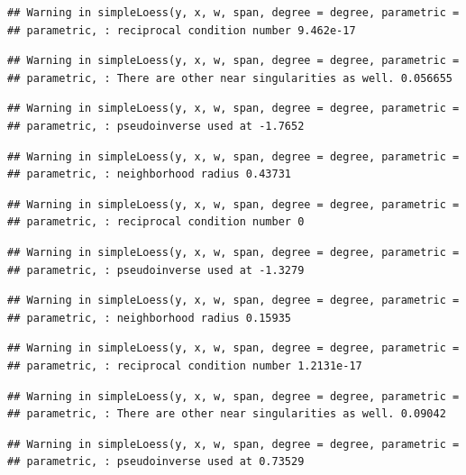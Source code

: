 \documentclass[]{article}
\begin{document}
\begin{verbatim}
## Warning in simpleLoess(y, x, w, span, degree = degree, parametric =
## parametric, : reciprocal condition number 9.462e-17
\end{verbatim}

\begin{verbatim}
## Warning in simpleLoess(y, x, w, span, degree = degree, parametric =
## parametric, : There are other near singularities as well. 0.056655
\end{verbatim}

\begin{verbatim}
## Warning in simpleLoess(y, x, w, span, degree = degree, parametric =
## parametric, : pseudoinverse used at -1.7652
\end{verbatim}

\begin{verbatim}
## Warning in simpleLoess(y, x, w, span, degree = degree, parametric =
## parametric, : neighborhood radius 0.43731
\end{verbatim}

\begin{verbatim}
## Warning in simpleLoess(y, x, w, span, degree = degree, parametric =
## parametric, : reciprocal condition number 0
\end{verbatim}

\begin{verbatim}
## Warning in simpleLoess(y, x, w, span, degree = degree, parametric =
## parametric, : pseudoinverse used at -1.3279
\end{verbatim}

\begin{verbatim}
## Warning in simpleLoess(y, x, w, span, degree = degree, parametric =
## parametric, : neighborhood radius 0.15935
\end{verbatim}

\begin{verbatim}
## Warning in simpleLoess(y, x, w, span, degree = degree, parametric =
## parametric, : reciprocal condition number 1.2131e-17
\end{verbatim}

\begin{verbatim}
## Warning in simpleLoess(y, x, w, span, degree = degree, parametric =
## parametric, : There are other near singularities as well. 0.09042
\end{verbatim}

\begin{verbatim}
## Warning in simpleLoess(y, x, w, span, degree = degree, parametric =
## parametric, : pseudoinverse used at 0.73529
\end{verbatim}
\end{document}
